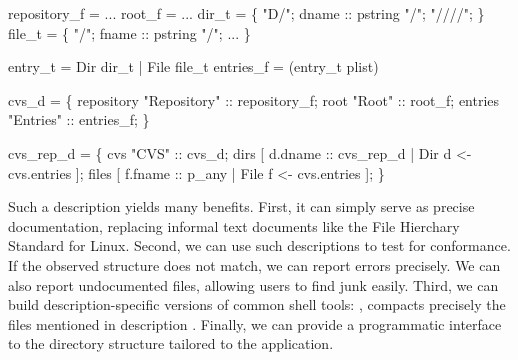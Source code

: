 \documentclass[nocopyrightspace,10pt]{sigplanconf}
\begin{document}
\begin{tightcode}
 repository_f = ...
 root_f = ...
 dir_t =  
  \{ "D/";  dname :: pstring "/";  "////"; \} 
 file_t =  
  \{ "/";   fname :: pstring "/";   ... \}

 entry_t = Dir  dir_t | File  file_t
 entries_f =  (entry_t plist)

 cvs_d =  \{
  repository  "Repository" :: repository_f;
  root        "Root"       :: root_f;
  entries     "Entries"    :: entries_f; \}

 cvs_rep_d =  \{
  cvs    "CVS" :: cvs_d;
  dirs   [ d.dname :: cvs_rep_d | 
                  Dir  d <- cvs.entries ];
  files  [ f.fname :: p_any      | 
                  File f <- cvs.entries ]; \}
\end{tightcode}
Such a description yields many benefits.  First, it can simply
serve as precise documentation, replacing
informal text documents like the File Hierchary Standard for Linux.
Second, we can use such descriptions to test for conformance.
If the observed structure does not match, we can report errors
precisely.  We can also report undocumented files, allowing users
to find junk easily.  Third, we can build description-specific
versions of common shell tools: \eg{},  compacts
precisely the files 
mentioned in description .  
Finally, we can provide a programmatic interface to
the directory structure tailored to the application. 


%


\end{document}
